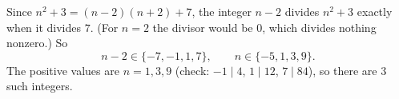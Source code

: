Since $n^2+3=(n-2)(n+2)+7$, the integer $n-2$ divides $n^2+3$ exactly when it divides $7$. (For $n=2$ the divisor would be $0$, which divides nothing nonzero.) So
\[n-2\in\{-7,-1,1,7\},\qquad n\in\{-5,1,3,9\}.\]
The positive values are $n=1,3,9$ (check: $-1\mid4$, $1\mid12$, $7\mid84$), so there are $\boxed{3}$ such integers.

